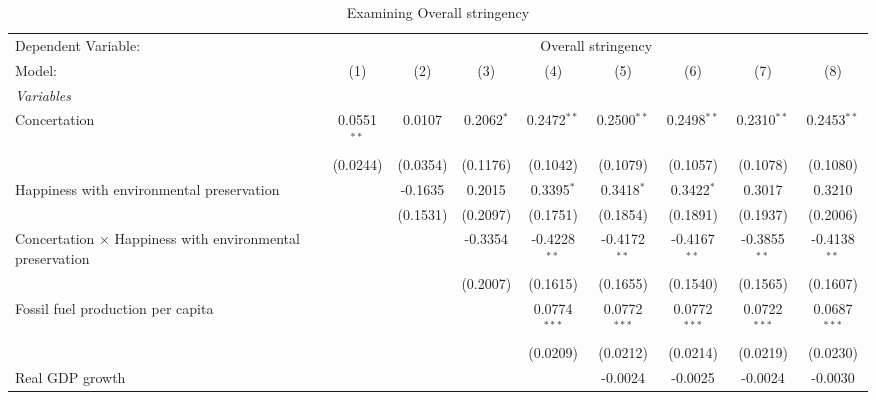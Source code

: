 
\begin{table}[htbp]
   \caption{Examining Overall stringency}
   \centering
   \begin{tabular}{lcccccccc}
      \tabularnewline \midrule \midrule
      Dependent Variable: & \multicolumn{8}{c}{Overall stringency}\\
      Model:                                                           & (1)           & (2)      & (3)          & (4)            & (5)            & (6)            & (7)            & (8)\\  
      \midrule
      \emph{Variables}\\
      Concertation                                                     & 0.0551$^{**}$ & 0.0107   & 0.2062$^{*}$ & 0.2472$^{**}$  & 0.2500$^{**}$  & 0.2498$^{**}$  & 0.2310$^{**}$  & 0.2453$^{**}$\\   
                                                                       & (0.0244)      & (0.0354) & (0.1176)     & (0.1042)       & (0.1079)       & (0.1057)       & (0.1078)       & (0.1080)\\   
      Happiness with environmental preservation                        &               & -0.1635  & 0.2015       & 0.3395$^{*}$   & 0.3418$^{*}$   & 0.3422$^{*}$   & 0.3017         & 0.3210\\   
                                                                       &               & (0.1531) & (0.2097)     & (0.1751)       & (0.1854)       & (0.1891)       & (0.1937)       & (0.2006)\\   
      Concertation $\times$ Happiness with environmental preservation  &               &          & -0.3354      & -0.4228$^{**}$ & -0.4172$^{**}$ & -0.4167$^{**}$ & -0.3855$^{**}$ & -0.4138$^{**}$\\   
                                                                       &               &          & (0.2007)     & (0.1615)       & (0.1655)       & (0.1540)       & (0.1565)       & (0.1607)\\   
      Fossil fuel production per capita                                &               &          &              & 0.0774$^{***}$ & 0.0772$^{***}$ & 0.0772$^{***}$ & 0.0722$^{***}$ & 0.0687$^{***}$\\   
                                                                       &               &          &              & (0.0209)       & (0.0212)       & (0.0214)       & (0.0219)       & (0.0230)\\   
      Real GDP growth                                                  &               &          &              &                & -0.0024        & -0.0025        & -0.0024        & -0.0030\\   

\end{tabular}
\end{table}
